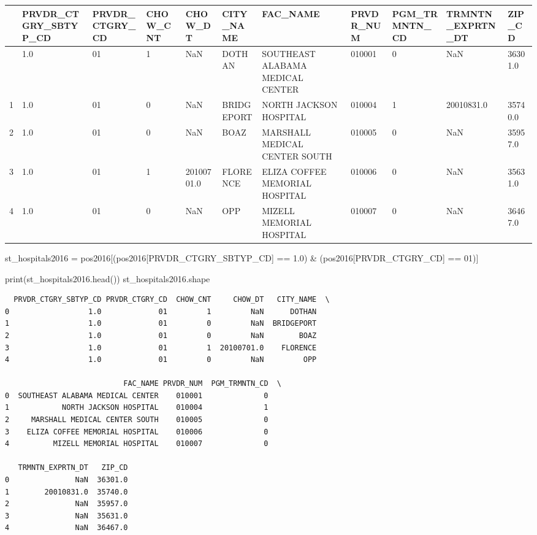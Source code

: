 \documentclass[
  letterpaper,
  DIV=11,
  numbers=noendperiod]{scrartcl}
\newenvironment{Shaded}{\begin{snugshade}}{\end{snugshade}}
\newcommand{\BuiltInTok}[1]{\textcolor[rgb]{0.00,0.23,0.31}{#1}}
\newcommand{\NormalTok}[1]{\textcolor[rgb]{0.00,0.23,0.31}{#1}}
\newcommand{\OperatorTok}[1]{\textcolor[rgb]{0.37,0.37,0.37}{#1}}
\newcommand{\StringTok}[1]{\textcolor[rgb]{0.13,0.47,0.30}{#1}}
\begin{document}
\begin{longtable}[]{@{}lllllllllll@{}}
\toprule\noalign{}
& PRVDR\_CTGRY\_SBTYP\_CD & PRVDR\_CTGRY\_CD & CHOW\_CNT & CHOW\_DT &
CITY\_NAME & FAC\_NAME & PRVDR\_NUM & PGM\_TRMNTN\_CD &
TRMNTN\_EXPRTN\_DT & ZIP\_CD \\
\midrule\noalign{}
\endhead
\bottomrule\noalign{}
\endlastfoot
0 & 1.0 & 01 & 1 & NaN & DOTHAN & SOUTHEAST ALABAMA MEDICAL CENTER &
010001 & 0 & NaN & 36301.0 \\
1 & 1.0 & 01 & 0 & NaN & BRIDGEPORT & NORTH JACKSON HOSPITAL & 010004 &
1 & 20010831.0 & 35740.0 \\
2 & 1.0 & 01 & 0 & NaN & BOAZ & MARSHALL MEDICAL CENTER SOUTH & 010005 &
0 & NaN & 35957.0 \\
3 & 1.0 & 01 & 1 & 20100701.0 & FLORENCE & ELIZA COFFEE MEMORIAL
HOSPITAL & 010006 & 0 & NaN & 35631.0 \\
4 & 1.0 & 01 & 0 & NaN & OPP & MIZELL MEMORIAL HOSPITAL & 010007 & 0 &
NaN & 36467.0 \\
\end{longtable}

\begin{Shaded}
\begin{Highlighting}[]
\NormalTok{st\_hospitals2016 }\OperatorTok{=}\NormalTok{ pos2016[(pos2016[}\StringTok{\textquotesingle{}PRVDR\_CTGRY\_SBTYP\_CD\textquotesingle{}}\NormalTok{] }\OperatorTok{==} \StringTok{\textquotesingle{}1.0\textquotesingle{}}\NormalTok{) }\OperatorTok{\&}\NormalTok{ (pos2016[}\StringTok{\textquotesingle{}PRVDR\_CTGRY\_CD\textquotesingle{}}\NormalTok{] }\OperatorTok{==} \StringTok{\textquotesingle{}01\textquotesingle{}}\NormalTok{)]}

\BuiltInTok{print}\NormalTok{(st\_hospitals2016.head())}
\NormalTok{st\_hospitals2016.shape}
\end{Highlighting}
\end{Shaded}

\begin{verbatim}
  PRVDR_CTGRY_SBTYP_CD PRVDR_CTGRY_CD  CHOW_CNT     CHOW_DT   CITY_NAME  \
0                  1.0             01         1         NaN      DOTHAN   
1                  1.0             01         0         NaN  BRIDGEPORT   
2                  1.0             01         0         NaN        BOAZ   
3                  1.0             01         1  20100701.0    FLORENCE   
4                  1.0             01         0         NaN         OPP   

                           FAC_NAME PRVDR_NUM  PGM_TRMNTN_CD  \
0  SOUTHEAST ALABAMA MEDICAL CENTER    010001              0   
1            NORTH JACKSON HOSPITAL    010004              1   
2     MARSHALL MEDICAL CENTER SOUTH    010005              0   
3    ELIZA COFFEE MEMORIAL HOSPITAL    010006              0   
4          MIZELL MEMORIAL HOSPITAL    010007              0   

   TRMNTN_EXPRTN_DT   ZIP_CD  
0               NaN  36301.0  
1        20010831.0  35740.0  
2               NaN  35957.0  
3               NaN  35631.0  
4               NaN  36467.0  
\end{verbatim}
\end{document}
